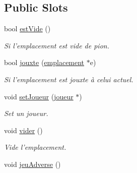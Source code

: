 \subsection*{Public Slots}
\begin{DoxyCompactItemize}
\item 
\hypertarget{classemplacement_afd15b612d02b7cbfd0480b5b380c2b07}{bool \hyperlink{classemplacement_afd15b612d02b7cbfd0480b5b380c2b07}{est\-Vide} ()}\label{classemplacement_afd15b612d02b7cbfd0480b5b380c2b07}

\begin{DoxyCompactList}\small\item\em Si l'emplacement est vide de pion. \end{DoxyCompactList}\item 
\hypertarget{classemplacement_a70e22f75b934e4daa40582708c4e01f5}{bool \hyperlink{classemplacement_a70e22f75b934e4daa40582708c4e01f5}{jouxte} (\hyperlink{classemplacement}{emplacement} $\ast$e)}\label{classemplacement_a70e22f75b934e4daa40582708c4e01f5}

\begin{DoxyCompactList}\small\item\em Si l'emplacement est jouxte à celui actuel. \end{DoxyCompactList}\item 
\hypertarget{classemplacement_a9e57590839f9c185d962030b221b8ea1}{void \hyperlink{classemplacement_a9e57590839f9c185d962030b221b8ea1}{set\-Joueur} (\hyperlink{classjoueur}{joueur} $\ast$)}\label{classemplacement_a9e57590839f9c185d962030b221b8ea1}

\begin{DoxyCompactList}\small\item\em Set un joueur. \end{DoxyCompactList}\item 
\hypertarget{classemplacement_ada71fd6bec4969e4ef5be1a610d712a4}{void \hyperlink{classemplacement_ada71fd6bec4969e4ef5be1a610d712a4}{vider} ()}\label{classemplacement_ada71fd6bec4969e4ef5be1a610d712a4}

\begin{DoxyCompactList}\small\item\em Vide l'emplacement. \end{DoxyCompactList}\item 
\hypertarget{classemplacement_aae4d4694984d645ddb397b5847032fa0}{void \hyperlink{classemplacement_aae4d4694984d645ddb397b5847032fa0}{jeu\-Adverse} ()}\label{classemplacement_aae4d4694984d645ddb397b5847032fa0}


\end{DoxyCompactItemize}
